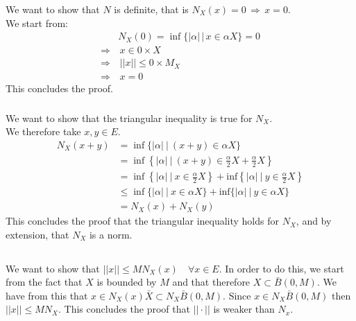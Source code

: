 \documentclass{article}
\begin{document}
\subsubsection{}%
We want to show that $N$ is definite, that is $N_X(x) = 0 \, \Rightarrow \, x=0$. \\

\noindent We start from:
\begin{align*}
	& N_X(0) = \inf\{|\alpha | \, |  \, x \in \alpha X\} = 0\\
	\Rightarrow& \, x \in 0 \times X\\
	\Rightarrow& \, ||x|| \leq 0 \times M_X\\
	\Rightarrow& \, x = 0
\end{align*}
This concludes the proof.


\subsubsection{}%

We want to show that the triangular inequality is true for $N_X$.\\ 
We therefore take $x,y \in E$.
\begin{align*}
N_X(x+y) &= \inf\{|\alpha| \ | \ (x+y) \in \alpha X\}\\
&= \inf\left\{|\alpha| \ | \ (x+y) \in \frac{\alpha}{2} X+ \frac{\alpha}{2} X\right\}\\
&= \inf\left\{|\alpha| \ | \ x \in \frac{\alpha}{2}  X\right\} +  \textrm{inf}\left\{|\alpha| \ | \ y\in \frac{\alpha}{2}  X\right\}\\
&\leq \inf\{|\alpha| \ | \ x\in \alpha X\} + \textrm{inf}\{|\alpha| \ | \ y\in \alpha X\}\\
&= N_X(x) + N_X(y)
\end{align*}
This concludes the proof that the triangular inequality holds for $N_X$, and by extension, that $N_X$ is a norm.

\subsection{} %

\subsubsection{} %

We want to show that $||x|| \leq MN_X(x) \quad \forall x \in E$. In order to do this, we start from the fact that $X$ is bounded by $M$ and that therefore $X \subset \bar{B}(0,M)$. We have from this that $x \in N_X(x)\bar{X} \subset N_X\bar{B}(0,M)$. Since $x \in N_X\bar{B}(0,M)$ then $||x|| \leq MN_X$. This concludes the proof that $|| \cdot ||$ is weaker than $N_x$.
\end{document}

